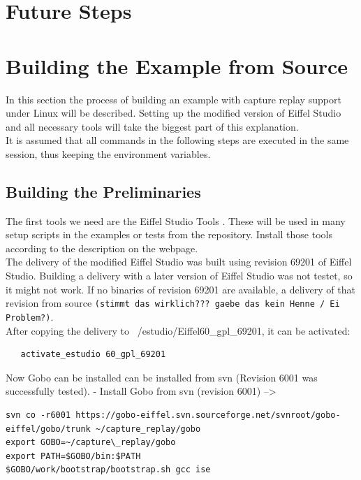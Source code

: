 \section{Future Steps}

\section{Building the Example from Source}
In this section the process of building an example with capture replay support under Linux will be described. Setting up the modified version of Eiffel Studio and all necessary tools will take the biggest part of this explanation.\\
It is assumed that all commands in the following steps are executed in the same session, thus keeping the environment variables.\\

\subsection{Building the Preliminaries}
The first tools we need are the  Eiffel Studio Tools \cite{estudiotools}. These will be used in many setup scripts in the examples or tests from the repository. Install those tools according to the description on the webpage.\\

The delivery of the modified Eiffel Studio was built using revision 69201 of Eiffel Studio. Building a delivery with a later version of Eiffel Studio was not testet, so it might not work. If no binaries of revision 69201 are available, a delivery of that revision from source \texttt{(stimmt das wirklich??? gaebe das kein Henne / Ei Problem?)}.\\
After copying the delivery to ~/estudio/Eiffel60\_gpl\_69201, it can be activated:
\bashlisting
\begin{lstlisting}
   activate_estudio 60_gpl_69201
\end{lstlisting}

Now Gobo \cite{gobo} can be installed can be installed from svn (Revision 6001 was successfully tested).
- Install Gobo  from svn (revision 6001) -->
\begin{lstlisting}
svn co -r6001 https://gobo-eiffel.svn.sourceforge.net/svnroot/gobo-eiffel/gobo/trunk ~/capture_replay/gobo
export GOBO=~/capture\_replay/gobo
export PATH=$GOBO/bin:$PATH
$GOBO/work/bootstrap/bootstrap.sh gcc ise
\end{lstlisting}

